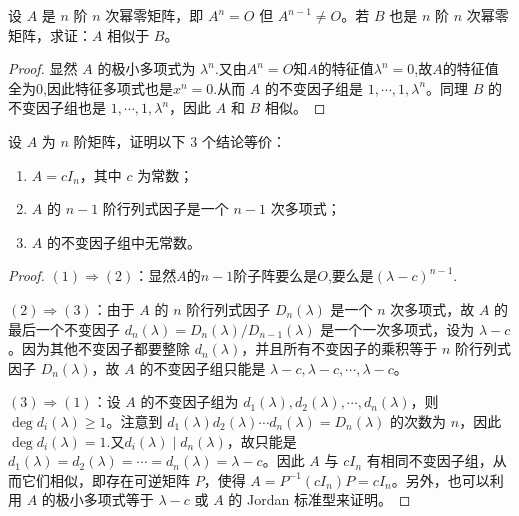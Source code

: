 \documentclass[../../main.tex]{subfiles}%
\begin{document}
\begin{proposition}[同阶幂零阵必相似]\label{proposition:同阶幂零阵必相似}
设 \(A\) 是 \(n\) 阶 \(n\) 次幂零矩阵，即 \(A^n = O\) 但 \(A^{n - 1}\neq O\)。若 \(B\) 也是 \(n\) 阶 \(n\) 次幂零矩阵，求证：\(A\) 相似于 \(B\)。
\end{proposition}
\begin{proof}
显然 \(A\) 的极小多项式为 \(\lambda^n\).又由$A^n=O$知$A$的特征值$\lambda^n=0$,故$A$的特征值全为0,因此特征多项式也是$x^n=0$.从而 \(A\) 的不变因子组是 \(1,\cdots,1,\lambda^n\)。同理 \(B\) 的不变因子组也是 \(1,\cdots,1,\lambda^n\)，因此 \(A\) 和 \(B\) 相似。
\end{proof}

\begin{proposition}\label{proposition:纯量阵关于不变因子和行列式因子的等价条件}
设 \(A\) 为 \(n\) 阶矩阵，证明以下 3 个结论等价：
\begin{enumerate}[(1)]
\item  \(A = cI_n\)，其中 \(c\) 为常数；

\item  \(A\) 的 \(n - 1\) 阶行列式因子是一个 \(n - 1\) 次多项式；

\item \(A\) 的不变因子组中无常数。
\end{enumerate}
\end{proposition}
\begin{proof}
\((1)\Rightarrow(2)\)：显然$A$的$n-1$阶子阵要么是$O$,要么是$(\lambda-c)^{n-1}$.

\((2)\Rightarrow(3)\)：由于 \(A\) 的 \(n\) 阶行列式因子 \(D_n(\lambda)\) 是一个 \(n\) 次多项式，故 \(A\) 的最后一个不变因子 \(d_n(\lambda)=D_n(\lambda)/D_{n - 1}(\lambda)\) 是一个一次多项式，设为 \(\lambda - c\)。因为其他不变因子都要整除 \(d_n(\lambda)\)，并且所有不变因子的乘积等于 \(n\) 阶行列式因子 \(D_n(\lambda)\)，故 \(A\) 的不变因子组只能是 \(\lambda - c,\lambda - c,\cdots,\lambda - c\)。 

\((3)\Rightarrow(1)\)：设 \(A\) 的不变因子组为 \(d_1(\lambda),d_2(\lambda),\cdots,d_n(\lambda)\)，则 \(\deg d_i(\lambda)\geqslant 1\)。注意到 \(d_1(\lambda)d_2(\lambda)\cdots d_n(\lambda)=D_n(\lambda)\) 的次数为 \(n\)，因此$\deg d_i(\lambda)=1$.又\(d_i(\lambda)\mid d_n(\lambda)\)，故只能是 \(d_1(\lambda)=d_2(\lambda)=\cdots=d_n(\lambda)=\lambda - c\)。因此 \(A\) 与 \(cI_n\) 有相同不变因子组，从而它们相似，即存在可逆矩阵 \(P\)，使得 \(A = P^{-1}(cI_n)P = cI_n\)。另外，也可以利用 \(A\) 的极小多项式等于 \(\lambda - c\) 或 \(A\) 的 Jordan 标准型来证明。
\end{proof}
\end{document}

